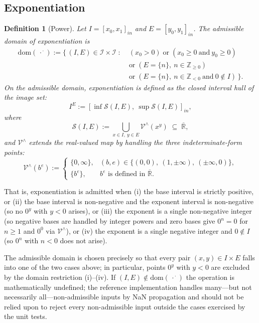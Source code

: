 \documentclass[11pt,a4paper]{article}
\theoremstyle{paperdef}
\newtheorem{definition}[theorem]{Definition}
\newcommand{\Rext}{\overline{\mathbb{R}}}
\newcommand{\Iset}{\mathcal{I}}
\newcommand{\inI}[1]{[#1]_{in}}
\newcommand{\Vhat}{\mathcal{V}^{\wedge}}
\begin{document}
\subsection{Exponentiation}\label{sec:exponentiation}

\begin{definition}[Power]\label{def:power}
Let $I = \inI{x_0, x_1}$ and $E = \inI{y_0, y_1}$. The
\emph{admissible domain} of exponentiation is
\begin{align*}
\mathrm{dom}(\,\cdot^{\,\cdot}) := \{\, (I, E) \in \Iset \times \Iset \;:\;
& (x_0 > 0) \;\text{or}\; (x_0 \ge 0\ \text{and}\ y_0 \ge 0)\\
& \text{or}\; (E = \{n\},\ n \in \mathbb{Z}_{\ge 0})\\
& \text{or}\; (E = \{n\},\ n \in \mathbb{Z}_{<0}\ \text{and}\ 0 \notin I)\,\}.
\end{align*}
On the admissible domain, exponentiation is defined as the closed
interval hull of the image set:
\[
I^{E} := \inI{\inf \mathcal{S}(I, E),\ \sup \mathcal{S}(I, E)},
\]
where
\[
\mathcal{S}(I, E) := \bigcup_{x \in I,\ y \in E} \Vhat(x^{y})
\;\subseteq\; \Rext,
\]
and $\Vhat$ extends the real-valued map by handling the three
indeterminate-form points:
\[
\Vhat(b^{e}) := \begin{cases}
\{0, \infty\}, & (b, e) \in \{(0,0),\ (1, \pm\infty),\ (\pm\infty, 0)\}, \\
\{b^{e}\}, & b^{e} \text{ is defined in } \Rext.
\end{cases}
\]
\end{definition}

That is, exponentiation is admitted when (i) the base interval is
strictly positive, or (ii) the base interval is non-negative and the
exponent interval is non-negative (so no $0^{y}$ with $y < 0$
arises), or (iii) the exponent is a single non-negative integer (so
negative bases are handled by integer powers and zero bases give
$0^{n} = 0$ for $n \ge 1$ and $0^{0}$ via $\Vhat$), or (iv) the
exponent is a single negative integer and $0 \notin I$ (so $0^{n}$
with $n < 0$ does not arise).

The admissible domain is chosen precisely so that every pair
$(x, y) \in I \times E$ falls into one of the two cases above; in
particular, points $0^{y}$ with $y < 0$ are excluded by the domain
restriction (i)--(iv). If $(I, E) \notin \mathrm{dom}(\,\cdot^{\,\cdot})$
the operation is mathematically undefined; the reference
implementation handles many---but not necessarily all---non-admissible
inputs by NaN propagation and should not be relied upon to reject
every non-admissible input outside the cases exercised by the unit
tests.
\end{document}
